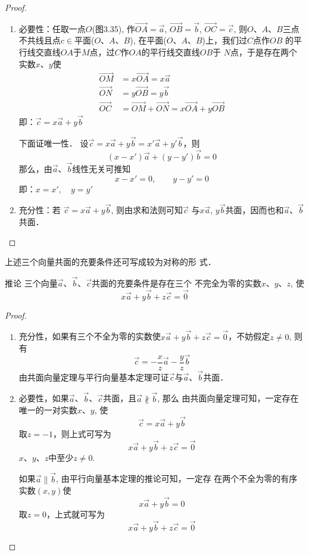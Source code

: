 \begin{proof}
\begin{enumerate}
    \item 必要性：任取一点$O$(图3.35), 作$\Vec{OA}=\vec{a}$, 
    $\Vec{OB}=\vec{b}$, $\Vec{OC}=\vec{c}$, 则$O$、$A$、$B$三点不共线且点$c\in $平面($O$、$A$、$B$), 在平面($O$、$A$、$B$)上，我们过$C$点作$OB$
    的平行线交直线$OA$于$M$点，过$C$作$OA$的平行线交直线$OB$于
    $N$点，于是存在两个实数$x$、$y$使
\[\begin{split}
     \Vec{OM}&=x\Vec{OA}=x\vec{a}\\
     \Vec{ON}&=y\Vec{OB}=y\vec{b}\\
     \Vec{OC}&=\Vec{OM}+\Vec{ON}=x\Vec{OA}+y\Vec{OB}
\end{split}\]
即：$\vec{c}=x\vec{a}+y\vec{b}$

下面证唯一性．
设$\vec{c}=x\vec{a}+y\vec{b}=x'\vec{a}+y'\vec{b}$，则\
\[(x-x')\vec{a}+(y-y')\vec{b}=0\]
那么，由$\vec{a}$、$\vec{b}$线性无关可推知
\[x-x'=0,\qquad y-y'=0\]
即：$x=x',\quad y=y'$

\item 充分性：若
$\vec{c}=x\vec{a}+y\vec{b}$, 则由求和法则可知$\vec{c}$
与$x\vec{a}$, $y\vec{b}$共面，因而也和$\vec{a}$、$\vec{b}$共面．
\end{enumerate}
\end{proof}

上述三个向量共面的充要条件还可写成较为对称的形
式．

\begin{blk}
    {推论} 三个向量$\vec{a}$、$\vec{b}$、$\vec{c}$共面的充要条件是存在三个
不完全为零的实数$x$、$y$、$z$, 使
\[x\vec{a}+y\vec{b}+z\vec{c}=\vec{0}\]
\end{blk}

\begin{proof}
\begin{enumerate}
    \item 充分性，如果有三个不全为零的实数使$x\vec{a}+y\vec{b}+z\vec{c}=\vec{0}$，不妨假定$z\ne 0$, 则有
\[\vec{c}=-\frac{x}{z}\vec{a}-\frac{y}{z}\vec{b}\]
    由共面向量定理与平行向量基本定理可证$\vec{c}$与$\vec{a}$、$\vec{b}$共面．

\item 必要性，如果$\vec{a}$、$\vec{b}$、$\vec{c}$共面，且$\vec{a}\nparallel \vec{b}$, 那么
由共面向量定理可知，一定存在唯一的一对实数$x$、$y$, 使
\[\vec{c}=x\vec{a}+y\vec{b}\]
取$z=-1$，则上式可写为
\[x\vec{a}+y\vec{b}+z\vec{c}=\vec{0}\]
$x$、$y$、$z$中至少$z\ne 0$.

如果$\vec{a}\parallel \vec{b}$, 由平行向量基本定理的推论可知，一定存
在两个不全为零的有序实数$(x,y)$使
\[x\vec{a}+y\vec{b}=0\]
取$z=0$，上式就可写为
\[x\vec{a}+y\vec{b}+z\vec{c}=\vec{0}\]
\end{enumerate}
\end{proof}    

